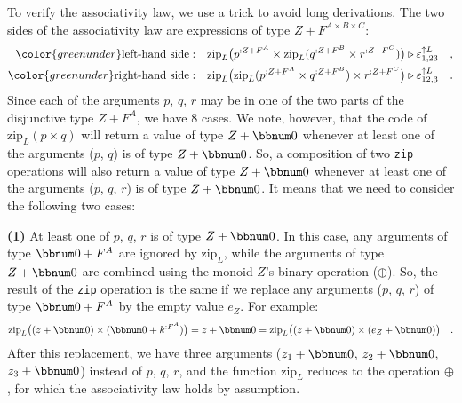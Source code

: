 To verify the associativity law, we use a trick to avoid long derivations.
The two sides of the associativity law are expressions of type $Z+F^{A\times B\times C}$:
\begin{align*}
{\color{greenunder}\text{left-hand side}:}\quad & \text{zip}_{L}\big(p^{:Z+F^{A}}\times\text{zip}_{L}(q^{:Z+F^{B}}\times r^{:Z+F^{C}})\big)\triangleright\varepsilon_{1,23}^{\uparrow L}\quad,\\
{\color{greenunder}\text{right-hand side}:}\quad & \text{zip}_{L}\big(\text{zip}_{L}(p^{:Z+F^{A}}\times q^{:Z+F^{B}})\times r^{:Z+F^{C}}\big)\triangleright\varepsilon_{12,3}^{\uparrow L}\quad.
\end{align*}
Since each of the arguments $p$, $q$, $r$ may be in one of the
two parts of the disjunctive type $Z+F^{A}$, we have 8 cases. We
note, however, that the code of $\text{zip}_{L}(p\times q)$ will
return a value of type $Z+\bbnum 0$ whenever at least one of the
arguments ($p$, $q$) is of type $Z+\bbnum 0$. So, a composition
of two \lstinline!zip! operations will also return a value of type
$Z+\bbnum 0$ whenever at least one of the arguments ($p$, $q$,
$r$) is of type $Z+\bbnum 0$. It means that we need to consider
the following two cases: 

\textbf{(1)} At least one of $p$, $q$, $r$ is of type $Z+\bbnum 0$.
In this case, any arguments of type $\bbnum 0+F^{A}$ are ignored
by $\text{zip}_{L}$, while the arguments of type $Z+\bbnum 0$ are
combined using the monoid $Z$\textsf{'}s binary operation ($\oplus$). So,
the result of the \lstinline!zip! operation is the same if we replace
any arguments ($p$, $q$, $r$) of type $\bbnum 0+F^{A}$ by the
empty value $e_{Z}$. For example:
\[
\text{zip}_{L}\big((z+\bbnum 0)\times(\bbnum 0+k^{:F^{A}})\big)=z+\bbnum 0=\text{zip}_{L}\big((z+\bbnum 0)\times(e_{Z}+\bbnum 0)\big)\quad.
\]
After this replacement, we have three arguments ($z_{1}+\bbnum 0$,
$z_{2}+\bbnum 0$, $z_{3}+\bbnum 0$) instead of $p$, $q$, $r$,
and the function $\text{zip}_{L}$ reduces to the operation $\oplus$,
for which the associativity law holds by assumption.%
\begin{comment}
{*}{*}{*} do we need this?
\begin{align*}
 & \text{zip}_{L}\big(p\times\text{zip}_{L}(q\times r)\big)\triangleright\varepsilon_{1,23}^{\uparrow L}=\big((z_{1}\oplus z_{2}\oplus z_{3})+\bbnum 0\big)\triangleright\varepsilon_{1,23}^{\uparrow L}=(z_{1}\oplus z_{2}\oplus z_{3})+\bbnum 0\quad,\\
 & \text{zip}_{L}\big(\text{zip}_{L}(p\times q)\times r\big)\triangleright\varepsilon_{12,3}^{\uparrow L}=\big((z_{1}\oplus z_{2}\oplus z_{3})+\bbnum 0\big)\triangleright\varepsilon_{12,3}^{\uparrow L}=(z_{1}\oplus z_{2}\oplus z_{3})+\bbnum 0\quad.
\end{align*}
\end{comment}

